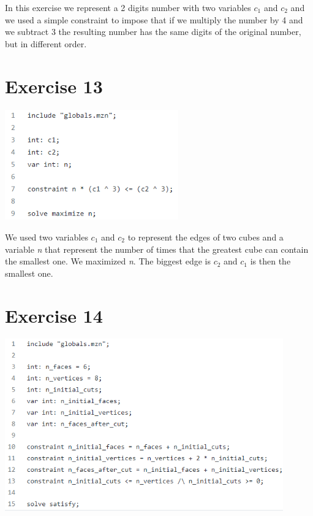 \documentclass{article}
\begin{document}
In this exercise we represent a 2 digits number with two variables \textit{$c_1$}
and  \textit{$c_2$} and we used a simple constraint to impose that if we multiply the number by 4 and we subtract 3 the resulting number has the same digits of the original number, but in different order.

\section{Exercise 13}
\vspace{0.2cm}
\includegraphics[width=7.5cm]{img/Es13.png}
\vspace{0.2cm}

We used two variables \textit{$c_1$} and \textit{$c_2$} to represent the edges of two cubes and a variable \textit{n} that represent the number of times that the greatest cube can contain the smallest one. We maximized \textit{n}.
The biggest edge is \textit{$c_2$} and \textit{$c_1$} is then the smallest one.

\section{Exercise 14}
\vspace{0.2cm}
\includegraphics[width=12cm]{img/Es14.png}
\vspace{0.2cm}
\end{document}
